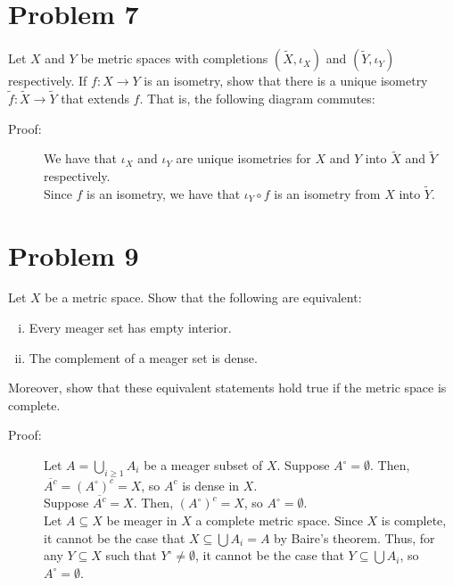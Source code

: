 \documentclass[10pt]{extarticle}
\begin{document}
  \section{Problem 7}%
  Let $X$ and $Y$ be metric spaces with completions $(\tilde{X},\iota_X)$ and $(\tilde{Y},\iota_Y)$ respectively. If $f: X\rightarrow Y$ is an isometry, show that there is a unique isometry $\tilde{f}: \tilde{X} \rightarrow \tilde{Y}$ that extends $f$. That is, the following diagram commutes:
  \begin{center}
  \end{center}
  \begin{description}
    \item[Proof:] We have that $\iota_X$ and $\iota_Y$ are unique isometries for $X$ and $Y$ into $\tilde{X}$ and $\tilde{Y}$ respectively.\\

      Since $f$ is an isometry, we have that $\iota_Y\circ f$ is an isometry from $X$ into $\tilde{Y}$.
  \end{description}
  \section{Problem 9}%
  Let $X$ be a metric space. Show that the following are equivalent:
  \begin{enumerate}[(i)]
    \item Every meager set has empty interior.
    \item The complement of a meager set is dense.
  \end{enumerate}
  Moreover, show that these equivalent statements hold true if the metric space is complete.
  \begin{description}
    \item[Proof:] Let $A = \bigcup_{i\geq 1}A_i$ be a meager subset of $X$. Suppose $A^{\circ} = \emptyset$. Then, $\overline{A^{c}} = \left(A^{\circ}\right)^{c} = X$, so $A^{c}$ is dense in $X$.\\

      Suppose $\overline{A^{c}} = X$. Then, $\left(A^{\circ}\right)^{c} = X$, so $A^{\circ} = \emptyset$.\\

      Let $A\subseteq X$ be meager in $X$ a complete metric space. Since $X$ is complete, it cannot be the case that $X\subseteq \bigcup A_i = A$ by Baire's theorem. Thus, for any $Y\subseteq X$ such that $Y^{\circ}\neq \emptyset$, it cannot be the case that $Y\subseteq \bigcup A_i$, so $A^{\circ} = \emptyset$.
  \end{description}
\end{document}
